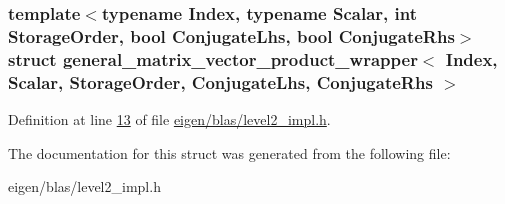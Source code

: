 \subsubsection*{template$<$typename Index, typename Scalar, int Storage\+Order, bool Conjugate\+Lhs, bool Conjugate\+Rhs$>$\newline
struct general\+\_\+matrix\+\_\+vector\+\_\+product\+\_\+wrapper$<$ Index, Scalar, Storage\+Order, Conjugate\+Lhs, Conjugate\+Rhs $>$}



Definition at line \hyperlink{eigen_2blas_2level2__impl_8h_source_l00013}{13} of file \hyperlink{eigen_2blas_2level2__impl_8h_source}{eigen/blas/level2\+\_\+impl.\+h}.



The documentation for this struct was generated from the following file\+:\begin{DoxyCompactItemize}
\item 
eigen/blas/level2\+\_\+impl.\+h\end{DoxyCompactItemize}
